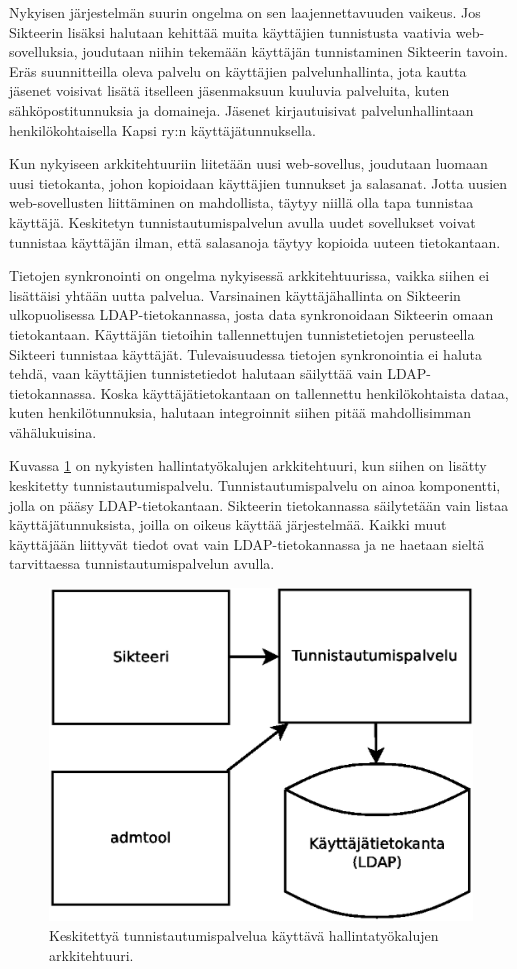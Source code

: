 Nykyisen järjestelmän suurin ongelma on sen laajennettavuuden vaikeus. Jos Sikteerin lisäksi halutaan kehittää muita käyttäjien tunnistusta vaativia web-sovelluksia, joudutaan niihin tekemään käyttäjän tunnistaminen Sikteerin tavoin. Eräs suunnitteilla oleva palvelu on käyttäjien palvelunhallinta, jota kautta jäsenet voisivat lisätä itselleen jäsenmaksuun kuuluvia palveluita, kuten sähköpostitunnuksia ja domaineja. Jäsenet kirjautuisivat palvelunhallintaan henkilökohtaisella Kapsi ry:n käyttäjätunnuksella.

Kun nykyiseen arkkitehtuuriin liitetään uusi web-sovellus, joudutaan luomaan uusi tietokanta, johon kopioidaan käyttäjien tunnukset ja salasanat. Jotta uusien web-sovellusten liittäminen on mahdollista, täytyy niillä olla tapa tunnistaa käyttäjä. Keskitetyn tunnistautumispalvelun avulla uudet sovellukset voivat tunnistaa käyttäjän ilman, että salasanoja täytyy kopioida uuteen tietokantaan.

Tietojen synkronointi on ongelma nykyisessä arkkitehtuurissa, vaikka siihen ei lisättäisi yhtään uutta palvelua. Varsinainen käyttäjähallinta on Sikteerin ulkopuolisessa LDAP-tie\-to\-kan\-nas\-sa, josta data synkronoidaan Sikteerin omaan tietokantaan. Käyttäjän tietoihin tallennettujen tunnistetietojen perusteella Sikteeri tunnistaa käyttäjät. Tulevaisuudessa tietojen synkronointia ei haluta tehdä, vaan käyttäjien tunnistetiedot halutaan säilyttää vain LDAP-tietokannassa. Koska käyttäjätietokantaan on tallennettu henkilökohtaista dataa, kuten henkilötunnuksia, halutaan integroinnit siihen pitää mahdollisimman vähälukuisina.

Kuvassa \ref{kapsi_nykyinen_uusi} on nykyisten hallintatyökalujen arkkitehtuuri, kun siihen on lisätty keskitetty tunnistautumispalvelu. Tunnistautumispalvelu on ainoa komponentti, jolla on pääsy LDAP-tietokantaan. Sikteerin tietokannassa säilytetään vain listaa käyttäjätunnuksista, joilla on oikeus käyttää järjestelmää. Kaikki muut käyttäjään liittyvät tiedot ovat vain LDAP-tietokannassa ja ne haetaan sieltä tarvittaessa tunnistautumispalvelun avulla.

\begin{figure}[!t]
\centering
\includegraphics[width=.7\textwidth]{toteutus/muutostarve/kapsi_uusi.eps}
\caption{Keskitettyä tunnistautumispalvelua käyttävä hallintatyökalujen arkkitehtuuri.}%
\label{kapsi_nykyinen_uusi}
\end{figure}

